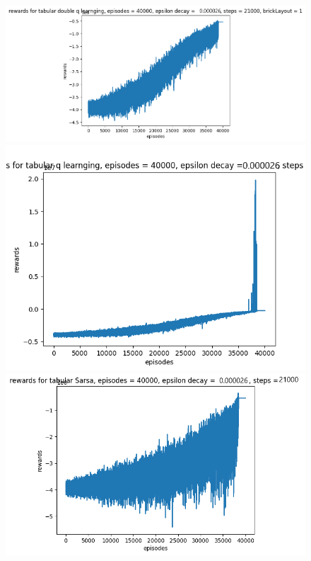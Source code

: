 \documentclass[twoside,11pt]{article}
\begin{document}
\begin{figure}[H]
\includegraphics[scale=0.4]{Rewards_Double_Q_Learning}
\includegraphics[scale=0.4]{Rewards_Q_Learning}\includegraphics[scale=0.4]{Rewards_Sarsa}
\centering
\end{figure}
\end{document}
